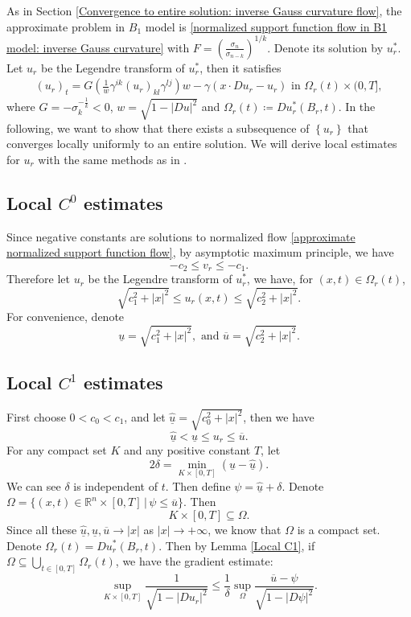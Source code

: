 \documentclass[reqno]{amsart}
\theoremstyle{remark}
\theoremstyle{definition}
\numberwithin{equation}{section}
\begin{document}
As in Section \ref{Convergence to entire solution: inverse Gauss curvature flow}, the approximate problem in $B_1$ model is \eqref{normalized support function flow in B1 model: inverse Gauss curvature} with $F=\left(\frac{\sigma_n}{\sigma_{n-k}}\right)^{1/k}$. Denote its solution by $u^*_r$.
Let $u_r$ be the Legendre transform of $u^*_r$, then it satisfies
\begin{align}
    (u_r)_t = G \left( \frac{1}{w} \gamma^{ik} (u_r)_{kl} \gamma^{lj} \right) w - \gamma \left( x \cdot Du_r - u_r \right) \text{ in } \Omega_r(t) \times (0, T], \label{normalized approximate flow by Legendre transform}
\end{align}
where $G = -\sigma_k^{-\frac{1}{k}}<0$, $w=\sqrt{1-|Du|^2}$ and $\Omega_r(t) \coloneqq Du_r^*(B_r, t)$. 
In the following, we want to show that there exists a subsequence of $\left\{ u_r \right\}$ that converges locally uniformly to an entire solution. We will derive local estimates for $u_r$ with the same methods as in \cite{Entiresigmakcurvatureflow}.


\subsection{Local \texorpdfstring{$C^0$}{C0} estimates}

Since negative constants are solutions to normalized flow \eqref{approximate normalized support function flow}, by asymptotic maximum principle, we have
\[
-c_2 \leqslant v_r \leqslant -c_1.
\]
Therefore let $u_r$ be the Legendre transform of $u^*_r$, we have, for $(x,t)\in\Omega_r(t)$, 
\[
\sqrt{c_1^2 + |x|^2} \leqslant u_r(x,t) \leqslant \sqrt{c_2^2 + |x|^2}.
\]
For convenience, denote
\[
\underline{u} = \sqrt{c_1^2 + |x|^2},
\text{ and } 
\overline{u} = \sqrt{c_2^2 + |x|^2}.
\]


\subsection{Local \texorpdfstring{$C^1$}{C1} estimates}

First choose $0 < c_0 < c_1$, and let $\hat{\underline{u}} = \sqrt{c_0^2 + |x|^2}$, then we have
\[
\hat{\underline{u}} < \underline{u} \leqslant u_r \leqslant \overline{u}.
\]
For any compact set $K$ and any positive constant $T$, let
\[
2\delta = \min_{K \times [0, T]} \left( \underline{u}-\hat{\underline{u}} \right).
\]
We can see $\delta$ is independent of $t$. Then define $\psi = \hat{\underline{u}} + \delta$. Denote $\Omega = \{(x,t) \in \mathbb{R}^n \times [0,T] \, | \, \psi \leqslant \overline{u}\}$. Then 
\[
K \times [0, T] \subseteq \Omega.
\]
Since all these $\hat{\underline{u}}, \underline{u}, \overline{u} \rightarrow \left| x \right|$ as $\left| x \right| \to +\infty$, we know that $\Omega$ is a compact set. Denote $\Omega_r(t) = Du^*_r(B_r, t)$. Then by Lemma \ref{Local C1}, if $\Omega \subseteq \bigcup_{t \in [0,T]} \Omega_r(t)$, we have the gradient estimate:
\[
\sup_{K \times [0,T]} \frac{1}{\sqrt{1 - |Du_r|^2}} \leqslant \frac{1}{\delta} \sup_{\Omega} \frac{\overline{u} - \psi}{\sqrt{1 - |D\psi|^2}}.
\]
\end{document}

